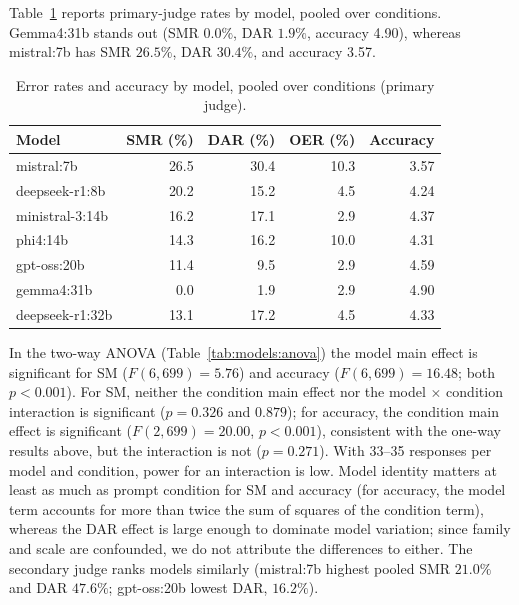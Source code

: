 \documentclass[journal,article,submit,pdftex,moreauthors]{Definitions/mdpi}
\begin{document}
Table~\ref{tab:models} reports primary-judge rates by model, pooled over conditions. Gemma4:31b stands out (SMR $0.0\%$, DAR $1.9\%$, accuracy 4.90), whereas mistral:7b has SMR $26.5\%$, DAR $30.4\%$, and accuracy 3.57.

\begin{table}[H]
\caption{Error rates and accuracy by model, pooled over conditions (primary judge).}
\label{tab:models}
\centering
\small
\begin{tabular}{lrrrr}
\toprule
Model & SMR (\%) & DAR (\%) & OER (\%) & Accuracy \\
\midrule
mistral:7b & 26.5 & 30.4 & 10.3 & 3.57 \\
deepseek-r1:8b & 20.2 & 15.2 & 4.5 & 4.24 \\
ministral-3:14b & 16.2 & 17.1 & 2.9 & 4.37 \\
phi4:14b & 14.3 & 16.2 & 10.0 & 4.31 \\
gpt-oss:20b & 11.4 & 9.5 & 2.9 & 4.59 \\
gemma4:31b & 0.0 & 1.9 & 2.9 & 4.90 \\
deepseek-r1:32b & 13.1 & 17.2 & 4.5 & 4.33 \\
\bottomrule
\end{tabular}
\end{table}

In the two-way ANOVA (Table~\ref{tab:models:anova}) the model main effect is significant for SM ($F(6, 699) = 5.76$) and accuracy ($F(6, 699) = 16.48$; both $p < 0.001$). For SM, neither the condition main effect nor the model $\times$ condition interaction is significant ($p = 0.326$ and $0.879$); for accuracy, the condition main effect is significant ($F(2, 699) = 20.00$, $p < 0.001$), consistent with the one-way results above, but the interaction is not ($p = 0.271$). With 33--35 responses per model and condition, power for an interaction is low. Model identity matters at least as much as prompt condition for SM and accuracy (for accuracy, the model term accounts for more than twice the sum of squares of the condition term), whereas the DAR effect is large enough to dominate model variation; since family and scale are confounded, we do not attribute the differences to either. The secondary judge ranks models similarly (mistral:7b highest pooled SMR $21.0\%$ and DAR $47.6\%$; gpt-oss:20b lowest DAR, $16.2\%$).
\end{document}
